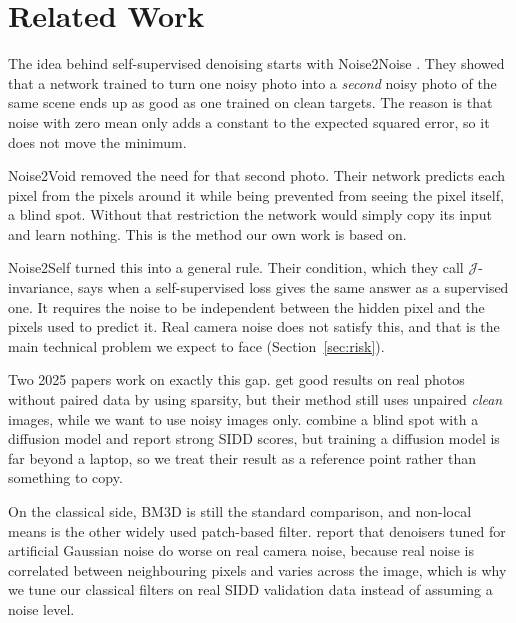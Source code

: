 \documentclass[11pt]{article}
\begin{document}
\section{Related Work}
\label{sec:related}
The idea behind self-supervised denoising starts with Noise2Noise
\citep{lehtinen2018noise2noise}. They showed that a network trained to turn one noisy photo
into a \emph{second} noisy photo of the same scene ends up as good as one trained on clean
targets. The reason is that noise with zero mean only adds a constant to the expected
squared error, so it does not move the minimum.

Noise2Void \citep{krull2019noise2void} removed the need for that second photo. Their
network predicts each pixel from the pixels around it while being prevented from seeing the
pixel itself, a blind spot. Without that restriction the network would simply copy its
input and learn nothing. This is the method our own work is based on.

Noise2Self \citep{batson2019noise2self} turned this into a general rule. Their condition,
which they call $\mathcal{J}$-invariance, says when a self-supervised loss gives the same
answer as a supervised one. It requires the noise to be independent between the hidden
pixel and the pixels used to predict it. Real camera noise does not satisfy this, and that
is the main technical problem we expect to face (Section~\ref{sec:risk}).

Two 2025 papers work on exactly this gap. \citet{chihaoui2025sparsity} get good results on
real photos without paired data by using sparsity, but their method still uses unpaired
\emph{clean} images, while we want to use noisy images only. \citet{cheng2025blindspot}
combine a blind spot with a diffusion model and report strong SIDD scores, but training a
diffusion model is far beyond a laptop, so we treat their result as a reference point
rather than something to copy.

On the classical side, BM3D \citep{dabov2007bm3d} is still the standard comparison, and
non-local means \citep{buades2011nlm} is the other widely used patch-based filter.
\citet{zhou2020awgn} report that denoisers tuned for artificial Gaussian noise do worse on
real camera noise, because real noise is correlated between neighbouring pixels and varies
across the image, which is why we tune our classical filters on real SIDD validation data
instead of assuming a noise level.
\end{document}
